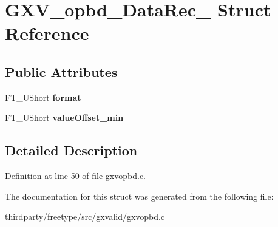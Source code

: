 \hypertarget{struct_g_x_v__opbd___data_rec__}{}\section{G\+X\+V\+\_\+opbd\+\_\+\+Data\+Rec\+\_\+ Struct Reference}
\label{struct_g_x_v__opbd___data_rec__}
\subsection*{Public Attributes}
\begin{DoxyCompactItemize}
\item 
\mbox{\label{struct_g_x_v__opbd___data_rec___acf247a93df6034e3ea036cc5084e1073}} 
F\+T\+\_\+\+U\+Short {\bfseries format}
\item 
\mbox{\label{struct_g_x_v__opbd___data_rec___adb7398013f9f981f94b364f1625e88ae}} 
F\+T\+\_\+\+U\+Short {\bfseries value\+Offset\+\_\+min}
\end{DoxyCompactItemize}


\subsection{Detailed Description}


Definition at line 50 of file gxvopbd.\+c.



The documentation for this struct was generated from the following file\+:\begin{DoxyCompactItemize}
\item 
thirdparty/freetype/src/gxvalid/gxvopbd.\+c\end{DoxyCompactItemize}
